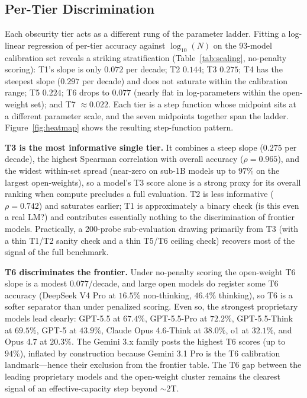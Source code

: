 \documentclass[11pt]{article}
\begin{document}
\subsection{Per-Tier Discrimination}

Each obscurity tier acts as a different rung of the parameter ladder. Fitting a log-linear regression of per-tier accuracy against $\log_{10}(N)$ on the 93-model calibration set reveals a striking stratification (Table~\ref{tab:scaling}, no-penalty scoring): T1's slope is only $0.072$ per decade; T2 $0.144$; T3 $0.275$; T4 has the steepest slope ($0.297$ per decade) and does not saturate within the calibration range; T5 $0.224$; T6 drops to $0.077$ (nearly flat in log-parameters within the open-weight set); and T7 $\approx 0.022$. Each tier is a step function whose midpoint sits at a different parameter scale, and the seven midpoints together span the ladder. Figure~\ref{fig:heatmap} shows the resulting step-function pattern.

\textbf{T3 is the most informative single tier.} It combines a steep slope ($0.275$ per decade), the highest Spearman correlation with overall accuracy ($\rho = 0.965$), and the widest within-set spread (near-zero on sub-1B models up to $97\%$ on the largest open-weights), so a model's T3 score alone is a strong proxy for its overall ranking when compute precludes a full evaluation. T2 is less informative ($\rho = 0.742$) and saturates earlier; T1 is approximately a binary check (is this even a real LM?) and contributes essentially nothing to the discrimination of frontier models. Practically, a 200-probe sub-evaluation drawing primarily from T3 (with a thin T1/T2 sanity check and a thin T5/T6 ceiling check) recovers most of the signal of the full benchmark.

\textbf{T6 discriminates the frontier.} Under no-penalty scoring the open-weight T6 slope is a modest $0.077$/decade, and large open models do register some T6 accuracy (DeepSeek V4 Pro at $16.5\%$ non-thinking, $46.4\%$ thinking), so T6 is a softer separator than under penalized scoring. Even so, the strongest proprietary models lead clearly: GPT-5.5 at $67.4\%$, GPT-5.5-Pro at $72.2\%$, GPT-5.5-Think at $69.5\%$, GPT-5 at $43.9\%$, Claude Opus 4.6-Think at $38.0\%$, o1 at $32.1\%$, and Opus 4.7 at $20.3\%$. The Gemini 3.x family posts the highest T6 scores (up to $94\%$), inflated by construction because Gemini 3.1 Pro is the T6 calibration landmark---hence their exclusion from the frontier table. The T6 gap between the leading proprietary models and the open-weight cluster remains the clearest signal of an effective-capacity step beyond $\sim$$2$T.
\end{document}
